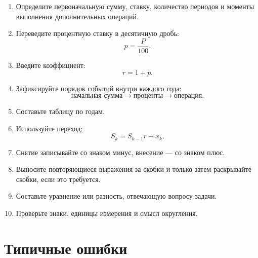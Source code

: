 \documentclass[a4paper,12pt]{article}
\begin{document}
\begin{enumerate}
  \item Определите первоначальную сумму, ставку, количество периодов и моменты
  выполнения дополнительных операций.

  \item Переведите процентную ставку в десятичную дробь:
  \[
  p=\frac{P}{100}.
  \]

  \item Введите коэффициент:
  \[
  r=1+p.
  \]

  \item Зафиксируйте порядок событий внутри каждого года:
  \[
  \text{начальная сумма}
  \longrightarrow
  \text{проценты}
  \longrightarrow
  \text{операция}.
  \]

  \item Составьте таблицу по годам.

  \item Используйте переход:
  \[
  S_k=S_{k-1}r+x_k.
  \]

  \item Снятие записывайте со знаком минус, внесение --- со знаком плюс.

  \item Выносите повторяющиеся выражения за скобки и только затем раскрывайте
  скобки, если это требуется.

  \item Составьте уравнение или разность, отвечающую вопросу задачи.

  \item Проверьте знаки, единицы измерения и смысл округления.
\end{enumerate}

\section{Типичные ошибки}
\end{document}
